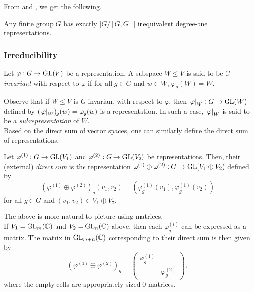 			From  and , we get the following.

			\begin{corollary}
				Any finite group $G$ has exactly $|G/[G,G]|$ inequivalent degree-one representations.
			\end{corollary}

		\subsubsection{Irreducibility}

			\begin{fdef}
				Let $\varphi : G \to \operatorname{GL}(V)$ be a representation. A subspace $W \le V$ is said to be \emph{$G$-invariant} with respect to $\varphi$ if for all $g \in G$ and $w \in W$, $\varphi_g(W) = W$.
			\end{fdef}

			Observe that if $W\le V$ is $G$-invariant with respect to $\varphi$, then $\left.\varphi\right|_{W} : G \to \operatorname{GL}(W)$ defined by $(\left.\varphi\right|_{W})_g(w) = \varphi_g(w)$ is a representation. In such a case, $\left.\varphi\right|_{W}$ is said to be a \emph{subrepresentation} of $W$.\\
			Based on the direct sum of vector spaces, one can similarly define the direct sum of representations.

			\begin{fdef}
				Let $\varphi^{(1)} : G \to \operatorname{GL}(V_1)$ and $\varphi^{(2)} : G \to \operatorname{GL}(V_2)$ be representations. Then, their (external) \emph{direct sum} is the representation $\varphi^{(1)} \oplus \varphi^{(2)} : G \to \operatorname{GL}(V_1 \oplus V_2)$ defined by
				\[ \left(\varphi^{(1)} \oplus \varphi^{(2)}\right)_g(v_1,v_2) = (\varphi^{(1)}_g(v_1), \varphi^{(1)}_g(v_2)) \]
				for all $g \in G$ and $(v_1,v_2) \in V_1 \oplus V_2$.
			\end{fdef}

			The above is more natural to picture using matrices.\\
			If $V_1 = \operatorname{GL}_m(\mathbb{C})$ and $V_2 = \operatorname{GL}_n(\mathbb{C})$ above, then each $\varphi^{(i)}_g$ can be expressed as a matrix. The matrix in $\operatorname{GL}_{m+n}(\mathbb{C})$ corresponding to their direct sum is then given by
			\[ \left( \varphi^{(1)} \oplus \varphi^{(2)} \right)_g = \begin{pmatrix} \varphi^{(1)}_g &  \\  & \varphi^{(2)}_g \end{pmatrix}, \]
			where the empty cells are appropriately sized $0$ matrices.\\
			
